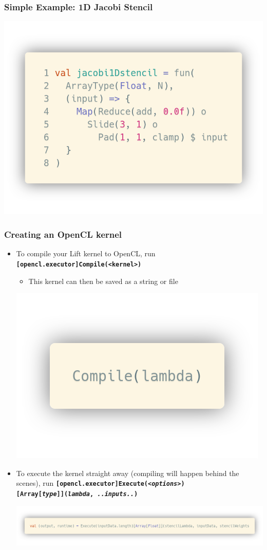 \documentclass[10pt]{beamer}
\newcommand{\code}[1]{\textbf{\texttt{#1}}}
\begin{document}
\begin{frame}
\frametitle{Simple Example: 1D Jacobi Stencil}
\begin{block}{}
    \begin{center}
    \includegraphics[width=.5\textwidth]{../images/jacobi1Dstencil.png}
    \end{center}
\end{block}
\end{frame}

\begin{frame}
\frametitle{Creating an OpenCL kernel}
\begin{itemize}
    \item To compile your Lift kernel to OpenCL, run \code{[opencl.executor]Compile(<kernel>)}
        \begin{itemize}
                \item This kernel can then be saved as a string or file
        \end{itemize}
        \vspace{-.7cm}
        \begin{block}{}
        \begin{center}
            \includegraphics[width=.2\textwidth]{../images/simpleCompile.png}
        \end{center}
        \end{block}
    \item To execute the kernel straight away (compiling will happen behind the scenes), run \code{[opencl.executor]Execute(\textit{<options>})     \\
        \hspace{0.5cm}[Array[\textit{type}]](\textit{lambda}, \textit{..inputs..})}
    \begin{block}{}
        \begin{center}
            \includegraphics[width=\textwidth]{../images/execute.png}
        \end{center}
    \end{block}
\end{itemize}
\end{frame}
\end{document}
